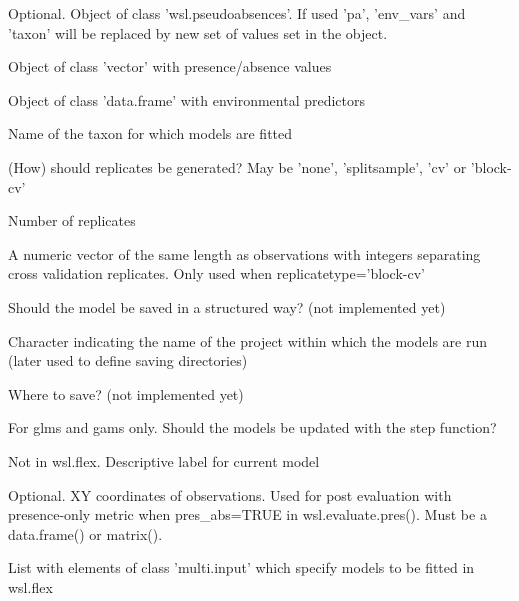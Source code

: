 \documentclass[a4paper]{book}
\begin{document}
\begin{Arguments}
\begin{ldescription}
\item[\code{x}] Optional. Object of class 'wsl.pseudoabsences'. If used 'pa', 'env\_vars' and 'taxon'
will be replaced by new set of values set in the object.

\item[\code{pa}] Object of class 'vector' with presence/absence values

\item[\code{env\_vars}] Object of class 'data.frame' with environmental predictors

\item[\code{taxon}] Name of the taxon for which models are fitted

\item[\code{replicatetype}] (How) should replicates be generated? May be 'none', 'splitsample',
'cv' or 'block-cv'

\item[\code{reps}] Number of replicates

\item[\code{strata}] A numeric vector of the same length as observations with integers separating
cross validation replicates. Only used when replicatetype='block-cv'

\item[\code{save}] Should the model be saved in a structured way? (not implemented yet)

\item[\code{project}] Character indicating the name of the project within which the models are run
(later used to define saving directories)

\item[\code{path}] Where to save? (not implemented yet)

\item[\code{step}] For glms and gams only. Should the models be updated with the step function?

\item[\code{mod\_tag}] Not in wsl.flex. Descriptive label for current model

\item[\code{xy}] Optional. XY coordinates of observations. Used for post evaluation with
presence-only metric when pres\_abs=TRUE in wsl.evaluate.pres(). Must be a data.frame()
or matrix().

\item[\code{mod\_args}] List with elements of class 'multi.input' which specify models to be fitted
in wsl.flex
\end{ldescription}
\end{Arguments}
\end{document}
